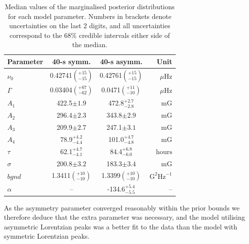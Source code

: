 \begin{table}[ht!]
	\begin{center}
		\caption{Median values of the marginalised posterior distributions for each model parameter. Numbers in brackets denote uncertainties on the last 2 digits, and all uncertainties correspond to the $68 \%$ credible intervals either side of the median.}
		\label{tab:PSD_fit_params}
		\begin{tabular}{l c c r}
			\hline
			{Parameter} & {40-s symm.} & {40-s asymm.} & {Unit} \\
			\hline
			
			{$\nu_0$} & {0.42741$\left(_{-15}^{+15}\right)$} & {0.42761$\left(_{-15}^{+15}\right)$} & {$\mu\mathrm{Hz} $}\\
			
			{$\Gamma$} & {0.03404$\left(_{-62}^{+67}\right)$} & {0.0471$\left(_{-10}^{+11}\right)$} & {$\mu\mathrm{Hz} $} \\
			
			{$A_1$} & {422.5$\pm 1.9$} & {472.8$_{-2.8}^{+2.7}$} & {$\mathrm{mG}$} \\
			
			{$A_2$} & {296.4$\pm 2.3$} & {343.8$\pm 2.9$} & {$\mathrm{mG}$} \\
			
			{$A_3$} & {209.9$\pm 2.7$} & {247.1$\pm 3.1$} & {$\mathrm{mG}$} \\
			
			{$A_4$} & {78.9$_{-4.4}^{+4.2}$} & {101.0$_{-4.8}^{+4.7}$} &  {$\mathrm{mG}$} \\	
			
			{$\tau$} & {62.1$_{-4.1}^{+4.7}$} & {84.4$_{-6.0}^{+6.8}$} & {$\mathrm{hours}$} \\	
			
			{$\sigma$} & {200.8$\pm 3.2$} & {183.3$\pm 3.4$} &  {$\mathrm{mG}$} \\	
			
			{$bgnd$} & {1.3411$\left(_{-10}^{+10}\right)$} & {1.3399$\left(_{-10}^{+10}\right)$}  & {$\mathrm{G}^2\mathrm{Hz}^{-1}$} \\	
			
			{$\alpha$} & {--} & {-134.6$_{-5.5}^{+5.4}$} & {--} \\	
			\hline
		\end{tabular}
	\end{center}
\end{table}

As the asymmetry parameter converged reasonably within the prior bounds we therefore deduce that the extra parameter was necessary, and the model utilising asymmetric Lorentzian peaks was a better fit to the data than the model with symmetric Lorentzian peaks.

